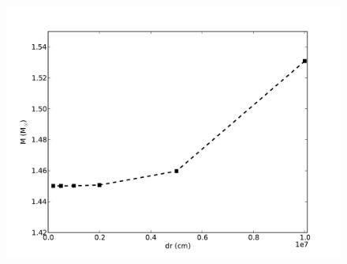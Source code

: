 \documentclass[12pt,preprint]{aastex}
\begin{document}
\begin{figure}[!ht]
\begin{center}
\includegraphics[width=5in]{RK4_mass.pdf}
\end{center}
\caption{ \label{f:RK4_mass}}
\end{figure}


% 
%

%
\end{document}
